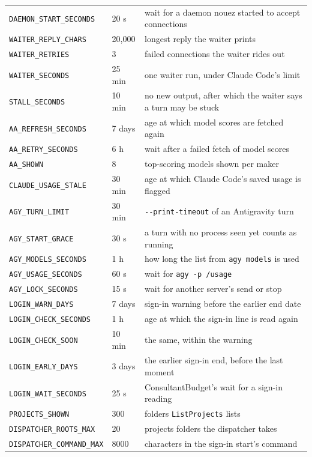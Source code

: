 \documentclass[10pt,a4paper]{article}
\newcommand{\code}[1]{\texttt{#1}}
\begin{document}
\begin{center}
\begin{tabular}{@{}l l l@{}}
\code{DAEMON\_START\_SECONDS} & 20 s & wait for a daemon nouez started to accept connections \\
\code{WAITER\_REPLY\_CHARS} & 20,000 & longest reply the waiter prints \\
\code{WAITER\_RETRIES} & 3 & failed connections the waiter rides out \\
\code{WAITER\_SECONDS} & 25 min & one waiter run, under Claude Code's limit \\
\code{STALL\_SECONDS} & 10 min & no new output, after which the waiter says a turn may be stuck \\
\code{AA\_REFRESH\_SECONDS} & 7 days & age at which model scores are fetched again \\
\code{AA\_RETRY\_SECONDS} & 6 h & wait after a failed fetch of model scores \\
\code{AA\_SHOWN} & 8 & top-scoring models shown per maker \\
\code{CLAUDE\_USAGE\_STALE} & 30 min & age at which Claude Code's saved usage is flagged \\
\code{AGY\_TURN\_LIMIT} & 30 min & \code{-{}-print-timeout} of an Antigravity turn \\
\code{AGY\_START\_GRACE} & 30 s & a turn with no process seen yet counts as running \\
\code{AGY\_MODELS\_SECONDS} & 1 h & how long the list from \code{agy models} is used \\
\code{AGY\_USAGE\_SECONDS} & 60 s & wait for \code{agy -p /usage} \\
\code{AGY\_LOCK\_SECONDS} & 15 s & wait for another server's send or stop \\
\code{LOGIN\_WARN\_DAYS} & 7 days & sign-in warning before the earlier end date \\
\code{LOGIN\_CHECK\_SECONDS} & 1 h & age at which the sign-in line is read again \\
\code{LOGIN\_CHECK\_SOON} & 10 min & the same, within the warning \\
\code{LOGIN\_EARLY\_DAYS} & 3 days & the earlier sign-in end, before the last moment \\
\code{LOGIN\_WAIT\_SECONDS} & 25 s & ConsultantBudget's wait for a sign-in reading \\
\code{PROJECTS\_SHOWN} & 300 & folders \code{ListProjects} lists \\
\code{DISPATCHER\_ROOTS\_MAX} & 20 & projects folders the dispatcher takes \\
\code{DISPATCHER\_COMMAND\_MAX} & 8000 & characters in the sign-in start's command \\

\end{tabular}
\end{center}
\end{document}
